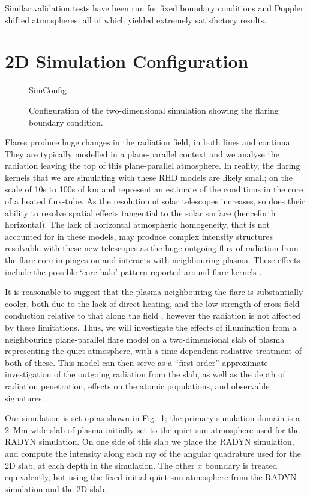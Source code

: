 Similar validation tests have been run for fixed boundary conditions and Doppler shifted atmospheres, all of which yielded extremely satisfactory results.

\section{2D Simulation Configuration}

\begin{figure}
\centering
{SimConfig}
\caption{Configuration of the two-dimensional simulation showing the flaring boundary condition.}
\label{Fig:2DSimConfig}
\end{figure}

Flares produce huge changes in the radiation field, in both lines and continua.
They are typically modelled in a plane-parallel context and we analyse the radiation leaving the top of this plane-parallel atmosphere.
In reality, the flaring kernels that we are simulating with these RHD models are likely small; on the scale of 10s to 100s of \si{\kilo\metre} and represent an estimate of the conditions in the core of a heated flux-tube.
As the resolution of solar telescopes increases, so does their ability to resolve spatial effects tangential to the solar surface (henceforth horizontal).
The lack of horizontal atmospheric homogeneity, that is not accounted for in these models, may produce complex intensity structures resolvable with these new telescopes as the huge outgoing flux of radiation from the flare core impinges on and interacts with neighbouring plasma.
These effects include the possible `core-halo' pattern reported around flare kernels \citep{Isobe2007}.

It is reasonable to suggest that the plasma neighbouring the flare is substantially cooler, both due to the lack of direct heating, and the low strength of cross-field conduction relative to that along the field \citep{Spitzer1953}, however the radiation is not affected by these limitations.
Thus, we will investigate the effects of illumination from a neighbouring plane-parallel flare model on a two-dimensional slab of plasma representing the quiet atmosphere, with a time-dependent radiative treatment of both of these.
This model can then serve as a ``first-order'' approximate investigation of the outgoing radiation from the slab, as well as the depth of radiation penetration, effects on the atomic populations, and observable signatures.

Our simulation is set up as shown in Fig.~\ref{Fig:2DSimConfig}; the primary simulation domain is a \SI{2}{\mega\metre} wide slab of plasma initially set to the quiet sun atmosphere used for the RADYN simulation.
On one side of this slab we place the RADYN simulation, and compute the intensity along each ray of the angular quadrature used for the 2D slab, at each depth in the simulation.
The other $x$ boundary is treated equivalently, but using the fixed initial quiet sun atmosphere from the RADYN simulation and the 2D slab.

